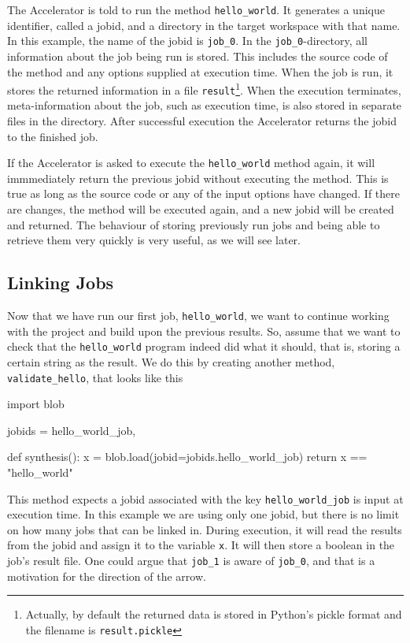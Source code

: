 \documentclass[a4paper]{article}
\begin{document}
\begin{figure}[h!]
  \begin{center}
    
    \caption{}
    \label{fig:run-hello-world}
  \end{center}
\end{figure}

\noindent The Accelerator is told to run the method \texttt{hello\_world}.  It
generates a unique identifier, called a jobid, and a directory in the
target workspace with that name.  In this example, the name of the
jobid is \texttt{job\_0}.  In the \texttt{job\_0}-directory, all
information about the job being run is stored.  This includes the
source code of the method and any options supplied at execution time.
When the job is run, it stores the returned information in a file
\texttt{result}\footnote{Actually, by default the returned data is
  stored in Python's pickle format and the filename is
  \texttt{result.pickle}}.  When the execution terminates,
meta-information about the job, such as execution time, is also stored
in separate files in the directory.  After successful execution the
Accelerator returns the jobid to the finished job.


If the Accelerator is asked to execute the \texttt{hello\_world}
method again, it will immmediately return the previous jobid without
executing the method.  This is true as long as the source code or any
of the input options have changed.  If there are changes, the method
will be executed again, and a new jobid will be created and returned.
The behaviour of storing previously run jobs and being able to
retrieve them very quickly is very useful, as we will see later.


\subsection{Linking Jobs}
Now that we have run our first job, \texttt{hello\_world}, we want to
continue working with the project and build upon the previous results.
So, assume that we want to check that the \texttt{hello\_world}
program indeed did what it should, that is, storing a certain string
as the result.  We do this by creating another method,
\texttt{validate\_hello}, that looks like this
\begin{python}
import blob
  
jobids = {hello_world_job,}

def synthesis():
    x = blob.load(jobid=jobids.hello_world_job)
    return x == "hello\_world"
\end{python}
This method expects a jobid associated with the key
\texttt{hello\_world\_job} is input at execution time.  In this
example we are using only one jobid, but there is no limit on how many
jobs that can be linked in.  During execution, it will read the
results from the jobid and assign it to the variable \texttt{x}.  It
will then store a boolean in the job's result file.  One could argue
that \texttt{job\_1} is aware of \texttt{job\_0}, and that is a
motivation for the direction of the arrow.
\end{document}
